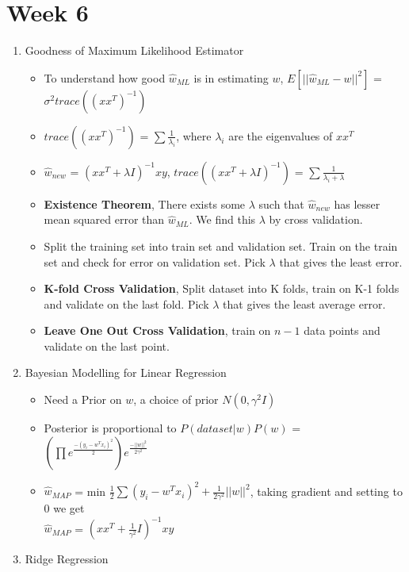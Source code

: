 \documentclass[a4paper]{article}
\begin{document}
\section{Week 6}
\begin{enumerate}
    \item Goodness of Maximum Likelihood Estimator
    \begin{itemize}
        \item To understand how good $\hat{w}_{ML}$ is in estimating $w$, $E[||\hat{w}_{ML} - w||^2]$ = $\sigma^2 trace((xx^T)^{-1})$
        \item $trace((xx^T)^{-1})$ = $\sum\frac{1}{\lambda_i}$, where $\lambda_i$ are the eigenvalues of $xx^T$
        \item $\hat{w}_{new}$ = $(xx^T+\lambda I)^{-1}xy$, $trace((xx^T+\lambda I)^{-1})$ = $\sum\frac{1}{\lambda_i + \lambda}$
        \item \textbf{Existence Theorem}, There exists some $\lambda$ such that $\hat{w}_{new}$ has lesser mean squared error than $\hat{w}_{ML}$. We find this $\lambda$ by cross validation.
        \item Split the training set into train set and validation set. Train on the train set and check for error on validation set. Pick $\lambda$ that gives the least error.
        \item \textbf{K-fold Cross Validation}, Split dataset into K folds, train on K-1 folds and validate on the last fold. Pick $\lambda$ that gives the least average error.
        \item \textbf{Leave One Out Cross Validation}, train on $n-1$ data points and validate on the last point.
    \end{itemize}
    \item Bayesian Modelling for Linear Regression
    \begin{itemize}
        \item Need a Prior on $w$, a choice of prior $N(0, \gamma^2I)$
        \item Posterior is proportional to $P(dataset|w)P(w)$ = $(\prod e^{\frac{-(y_i - w^Tx_i)^2}{2}})e^{\frac{-||w||^2}{2\gamma^2}}$
        \item $\hat{w}_{MAP}$ = min $\frac{1}{2}\sum(y_i-w^Tx_i)^2 + \frac{1}{2\gamma^2}||w||^2$, taking gradient and setting to 0 we get\\
        $\hat{w}_{MAP}$ = $(xx^T + \frac{1}{\gamma^2}I)^{-1}xy$
    \end{itemize}
    \item Ridge Regression

\end{enumerate}
\end{document}
